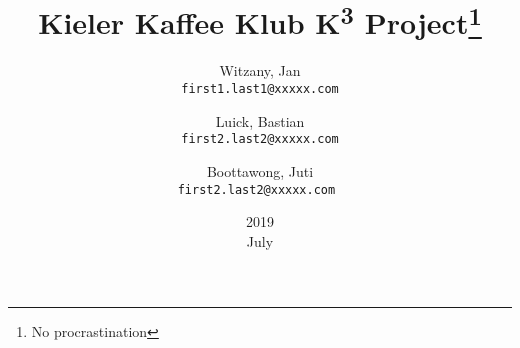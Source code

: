 \documentclass{article}
\title{Kieler Kaffee Klub K\textsuperscript{3} Project\thanks{No procrastination}}
\date{2019\\ July}
\author{
  Witzany, Jan\\
  \texttt{first1.last1@xxxxx.com}
  \and
  Luick, Bastian\\
  \texttt{first2.last2@xxxxx.com}
  \and
  Boottawong, Juti\\
  \texttt{first2.last2@xxxxx.com	}
}
\begin{document}
\begin{titlepage}
\maketitle

\end{titlepage}
\tableofcontents						%

\vspace{2cm} %
 






















  
\end{document}

